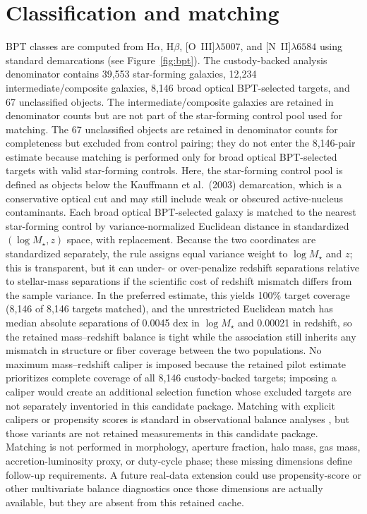 \documentclass[twocolumn]{aastex631}
\begin{document}
\section{Classification and matching}
BPT classes are computed from H$\alpha$, H$\beta$, [O~III]$\lambda5007$, and [N~II]$\lambda6584$ using standard demarcations \citep{baldwin1981,kewley2001,kauffmann2003bpt,kewley2006} (see Figure~\ref{fig:bpt}). The custody-backed analysis denominator contains 39,553 star-forming galaxies, 12,234 intermediate/composite galaxies, 8,146 broad optical BPT-selected targets, and 67 unclassified objects. The intermediate/composite galaxies are retained in denominator counts but are not part of the star-forming control pool used for matching. The 67 unclassified objects are retained in denominator counts for completeness but excluded from control pairing; they do not enter the 8,146-pair estimate because matching is performed only for broad optical BPT-selected targets with valid star-forming controls. Here, the star-forming control pool is defined as objects below the Kauffmann et al.\ (2003) demarcation, which is a conservative optical cut and may still include weak or obscured active-nucleus contaminants. Each broad optical BPT-selected galaxy is matched to the nearest star-forming control by variance-normalized Euclidean distance in standardized $(\log M_\star,z)$ space, with replacement. Because the two coordinates are standardized separately, the rule assigns equal variance weight to $\log M_\star$ and \(z\); this is transparent, but it can under- or over-penalize redshift separations relative to stellar-mass separations if the scientific cost of redshift mismatch differs from the sample variance. In the preferred estimate, this yields 100\% target coverage (8,146 of 8,146 targets matched), and the unrestricted Euclidean match has median absolute separations of 0.0045 dex in $\log M_\star$ and 0.00021 in redshift, so the retained mass--redshift balance is tight while the association still inherits any mismatch in structure or fiber coverage between the two populations. No maximum mass--redshift caliper is imposed because the retained pilot estimate prioritizes complete coverage of all 8,146 custody-backed targets; imposing a caliper would create an additional selection function whose excluded targets are not separately inventoried in this candidate package. Matching with explicit calipers or propensity scores is standard in observational balance analyses \citep{rosenbaumrubin1983}, but those variants are not retained measurements in this candidate package. Matching is not performed in morphology, aperture fraction, halo mass, gas mass, accretion-luminosity proxy, or duty-cycle phase; these missing dimensions define follow-up requirements. A future real-data extension could use propensity-score or other multivariate balance diagnostics once those dimensions are actually available, but they are absent from this retained cache.
\end{document}
